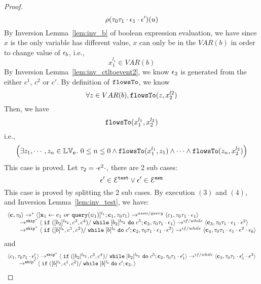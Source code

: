 \begin{proof}
\[  \rho(\mathtt{\tau}_0 \mathtt{\tau}_1 \cdot \mathtt{\epsilon}_1 \cdot \mathtt{\epsilon}') (u)
\]
%
By {Inversion Lemma~\ref{lem:inv_b}} of boolean expression evaluation, we have since $x$ is the only variable has different value, $x$ can only be in the $VAR(b)$ in order to change value of $\mathtt{\epsilon}_b$, i.e.,
 \[
  x_1^{l_1} \in VAR(b)
 \]
 By {Inversion Lemma~\ref{lem:inv_ctltoevent2}}, we know $\mathtt{\epsilon}_2$ is generated from the either $c^1$, $c^2$ or $c'$.
 By definition of $\mathtt{flowsTo}$, we know
 \[
 \forall z \in VAR(b), \mathtt{flowsTo}(z, x_2^{l2})
 \]
 Then, we have
 \[
 \mathtt{flowsTo}(x_1^{l_1}, x_2^{l_2})
 \]
 i.e.,
 \[
 \Big( \exists z_1, \cdots, z_n \in \mathbb{LV}_{{\boldsymbol{\mathbf{c}}}}. ~ 0 \leq n \leq 0 \land
  \mathtt{flowsTo}(x_1^{l_1}, z_1) 
  \land \cdots \land \mathtt{flowsTo}(z_n, x_2^{l_2}) \Big)
 \]
 This case is proved.
%
 Let $\mathtt{\tau}_2 = \cdot \mathtt{\epsilon}^2 \cdot$, there are 2 sub cases: 
 \[
 \mathtt{\epsilon}' \in \mathcal{E}^{\mathtt{{test}}} \lor \mathtt{\epsilon}' \in \mathcal{E}^{\mathtt{{asn}}}
 \]
 This case is proved by splitting the 2 sub cases.
 \subcaseL{$\event^2 \in \eventset^{\test}$}
By execution $(3)$ and $(4)$, and {Inversion Lemma~\ref{lem:inv_test}}, we have:
%
\[
  \begin{array}{l}   
  \langle {\boldsymbol{\mathbf{c}}}, \mathtt{\tau}_0 \rangle 
  \rightarrow^{*} 
  \langle [\mathrel{ {\boldsymbol{\mathbf{x}}}_1 \leftarrow e_1~ or ~ {\tt query}(\psi_1) }]^{l_1} ; {\boldsymbol{\mathbf{c}}}_1, \mathtt{\tau}_0 \mathtt{\tau}_1 \rangle  \rightarrow^{assn/query}
 \langle c_1, \mathtt{\tau}_0 \mathtt{\tau}_1 \cdot \mathtt{\epsilon}_1 \rangle 
  \\ 
  \qquad \rightarrow^{\mathtt{skip}^*} 
  \langle \;\mathtt{if}\;([b_2]{}^{l_{b_2}}, c^3, c^4) / \;\mathtt{while}\; [b_2]{}^{l_{b_2}} \;\mathtt{do}\; c^5; {\boldsymbol{\mathbf{c}}}_2, 
  \mathtt{\tau}_0 \mathtt{\tau}_1 \cdot \mathtt{\epsilon}_1 \rangle 
  \rightarrow^{if / while} 
  \langle {\boldsymbol{\mathbf{c}}}_3,  \mathtt{\tau}_0 \mathtt{\tau}_1 \cdot \mathtt{\epsilon}_1 \cdot \mathtt{\epsilon}^2 \rangle 
  \\ 
  \qquad \rightarrow^{\mathtt{skip}^*} 
  \langle \;\mathtt{if}\;([b]{}^{l_b}, c^1, c^2) / \;\mathtt{while}\; [b]{}^{l_b} \;\mathtt{do}\; c'; {\boldsymbol{\mathbf{c}}}_2, 
  \mathtt{\tau}_0 \mathtt{\tau}_1 \cdot \mathtt{\epsilon}_1\cdot \mathtt{\epsilon}^2 \rangle 
  \rightarrow^{if / while} 
  \langle {\boldsymbol{\mathbf{c}}}_4,  \mathtt{\tau}_0 \mathtt{\tau}_1 \cdot \mathtt{\epsilon}_1 \cdot \mathtt{\epsilon}^2 \cdot \mathtt{\epsilon}_b \rangle 
\end{array}
 \]
and 
 \[
  \begin{array}{l}   
  \langle c_1, \mathtt{\tau}_0 \mathtt{\tau}_1 \cdot \mathtt{\epsilon}_1' \rangle 
 \rightarrow^{\mathtt{skip}^*} 
  \langle \;\mathtt{if}\;([b_2]{}^{l_{b_2}}, c^3, c^4) / \;\mathtt{while}\; [b_2]{}^{l_{b_2}} \;\mathtt{do}\; c^5; {\boldsymbol{\mathbf{c}}}_2, 
  \mathtt{\tau}_0 \mathtt{\tau}_1 \cdot \mathtt{\epsilon}_1' \rangle 
  \rightarrow^{if / while} 
  \langle {\boldsymbol{\mathbf{c}}}_3,  \mathtt{\tau}_0 \mathtt{\tau}_1 \cdot \mathtt{\epsilon}_1' \cdot \mathtt{\epsilon}^3 \rangle 
  \\ 
  \qquad \rightarrow^{\mathtt{skip}^*} 
  \langle \;\mathtt{if}\;([b]{}^{l_b}, c^1, c^2) / \;\mathtt{while}\; [b]{}^{l_b} \;\mathtt{do}\; c'; {\boldsymbol{\mathbf{c}}}_2, 
 \rangle
\end{array}\]
\end{proof}

